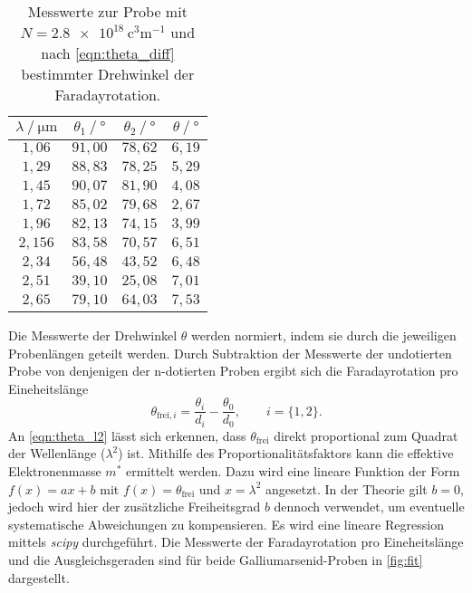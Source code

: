 \begin{table}
  \centering
  \caption{Messwerte zur Probe mit $N = \qty{2.8e18}{\cubic\centi\metre^{-1}}$ und nach \autoref{eqn:theta_diff} bestimmter Drehwinkel der Faradayrotation.}
  \label{tab:mw3}
  \begin{tabular}{c c c c}
    \toprule
    $\lambda \mathbin{/} \unit{\micro\meter}$ & $\theta_{1} \mathbin{/} \unit{\degree}$ & $\theta_{2} \mathbin{/} \unit{\degree}$ &%
     $\theta \mathbin{/} \unit{\degree}$ \\
    \midrule
    $1,06 $ & $91,00$ & $78,62$ & $6,19$ \\
    $1,29 $ & $88,83$ & $78,25$ & $5,29$ \\
    $1,45 $ & $90,07$ & $81,90$ & $4,08$ \\
    $1,72 $ & $85,02$ & $79,68$ & $2,67$ \\
    $1,96 $ & $82,13$ & $74,15$ & $3,99$ \\
    $2,156$ & $83,58$ & $70,57$ & $6,51$ \\
    $2,34 $ & $56,48$ & $43,52$ & $6,48$ \\
    $2,51 $ & $39,10$ & $25,08$ & $7,01$ \\
    $2,65 $ & $79,10$ & $64,03$ & $7,53$ \\
    \bottomrule
  \end{tabular}
\end{table}

Die Messwerte der Drehwinkel $\theta$ werden normiert, indem sie durch die jeweiligen Probenlängen geteilt werden. Durch Subtraktion der Messwerte der undotierten Probe von 
denjenigen der n-dotierten Proben ergibt sich die Faradayrotation pro Eineheitslänge 
\begin{equation*}
  \theta_{\text{frei}, i} = \frac{\theta_i}{d_i} - \frac{\theta_0}{d_0}, \qquad i = \{1, 2\}.
\end{equation*}
An \autoref{eqn:theta_l2} lässt sich erkennen, dass $\theta_\text{frei}$ direkt proportional zum Quadrat der Wellenlänge ($\lambda^2$) ist. Mithilfe des Proportionalitätsfaktors 
kann die effektive Elektronenmasse $m^*$ ermittelt werden. Dazu wird eine lineare Funktion der Form $f(x) = ax + b$ mit $f(x) = \theta_\text{frei}$ und $x = \lambda^2$
angesetzt. In der Theorie gilt $b = 0$, jedoch wird hier der zusätzliche Freiheitsgrad $b$ dennoch verwendet, um eventuelle systematische Abweichungen zu kompensieren.
Es wird eine lineare Regression mittels \textit{scipy} \cite{scipy} durchgeführt. Die Messwerte der Faradayrotation pro Eineheitslänge und die Ausgleichsgeraden sind für 
beide Galliumarsenid-Proben in \autoref{fig:fit} dargestellt.

